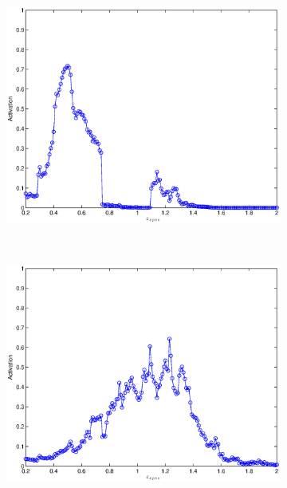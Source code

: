 \documentclass[useAMS,usenatbib,fleqn]{mn2e}
\begin{document}
\begin{figure}
\begin{subfigure}[b]{0.175\textwidth}
                \includegraphics[width=\textwidth]{figures/activation_03.eps}
        \end{subfigure}
        ~
        \begin{subfigure}[b]{0.175\textwidth}
                \includegraphics[width=\textwidth]{figures/activation_04.eps}
        \end{subfigure}
        ~
        \begin{subfigure}[b]{0.175\textwidth}

\end{subfigure}
\end{figure}
\end{document}
